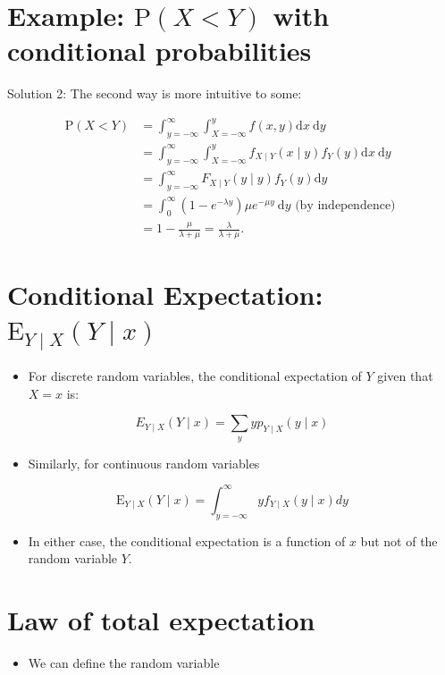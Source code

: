 \documentclass[10pt]{article}
\begin{document}
\section*{Example: $\mathrm{P}(X<Y)$ with conditional probabilities}
Solution 2: The second way is more intuitive to some:

$$
\begin{aligned}
\mathrm{P}(X<Y) & =\int_{y=-\infty}^{\infty} \int_{X=-\infty}^{y} f(x, y) \mathrm{d} x \mathrm{~d} y \\
& =\int_{y=-\infty}^{\infty} \int_{X=-\infty}^{y} f_{X \mid Y}(x \mid y) f_{Y}(y) \mathrm{d} x \mathrm{~d} y \\
& =\int_{y=-\infty}^{\infty} F_{X \mid Y}(y \mid y) f_{Y}(y) \mathrm{d} y \\
& =\int_{0}^{\infty}\left(1-e^{-\lambda y}\right) \mu e^{-\mu y} \mathrm{~d} y \text { (by independence) } \\
& =1-\frac{\mu}{\lambda+\mu}=\frac{\lambda}{\lambda+\mu} .
\end{aligned}
$$

\section*{Conditional Expectation: $\mathrm{E}_{Y \mid X}(Y \mid x)$}
\begin{itemize}
  \item For discrete random variables, the conditional expectation of $Y$ given that $X=x$ is:
\end{itemize}

$$
E_{Y \mid X}(Y \mid x)=\sum_{y} y p_{Y \mid X}(y \mid x)
$$

\begin{itemize}
  \item Similarly, for continuous random variables
\end{itemize}

$$
\mathrm{E}_{Y \mid X}(Y \mid x)=\int_{y=-\infty}^{\infty} y f_{Y \mid X}(y \mid x) d y
$$

\begin{itemize}
  \item In either case, the conditional expectation is a function of $x$ but not of the random variable $Y$.
\end{itemize}

\section*{Law of total expectation}
\begin{itemize}
  \item We can define the random variable
\end{itemize}
\end{document}

